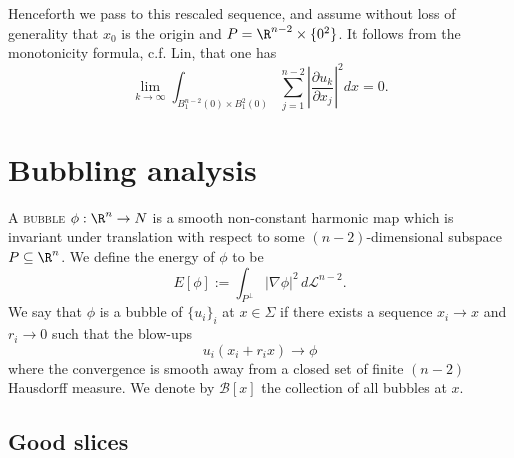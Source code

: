 \documentclass[reqno]{amsart}
\theoremstyle{definition}
\theoremstyle{remark}
\renewcommand{\emph}{\textsc}
\begin{document}
Henceforth we pass to this rescaled sequence, and assume without loss of generality that $x_0$ is the origin and $P = \R^{n -2} \times \{0^2\}$. It follows from the monotonicity formula, c.f. Lin, that one has
	\begin{equation}
		 \lim_{k \to \infty} \int_{B^{n - 2}_1 (0) \times B^2_1 (0)} \sum_{j = 1}^{n - 2} \left| \frac{\partial u_k}{\partial x_j}  \right|^2 dx = 0. \label{eq:symmetry}
	\end{equation}

\section{Bubbling analysis}

A \emph{bubble} $\phi : \R^n \to N$ is a smooth non-constant harmonic map which is invariant under translation with respect to some $(n - 2)$-dimensional subspace $P \subseteq \R^n$. We define the energy of $\phi$ to be 
	\[ E[\phi] := \int_{P^\perp} |\nabla \phi|^2 \, d\mathcal L^{n - 2}.  \]
We say that $\phi$ is a bubble of $\{u_i\}_i$ at $x \in \Sigma$ if there exists a sequence $x_i \to x$ and $r_i \to 0$ such that the blow-ups 
	\[ u_i ( x_i + r_i x) \to \phi \]
where the convergence is smooth away from a closed set of finite $(n - 2)$ Hausdorff measure. We denote by $\mathcal B[x]$ the collection of all bubbles at $x$. 


\subsection{Good slices}	
\end{document}
